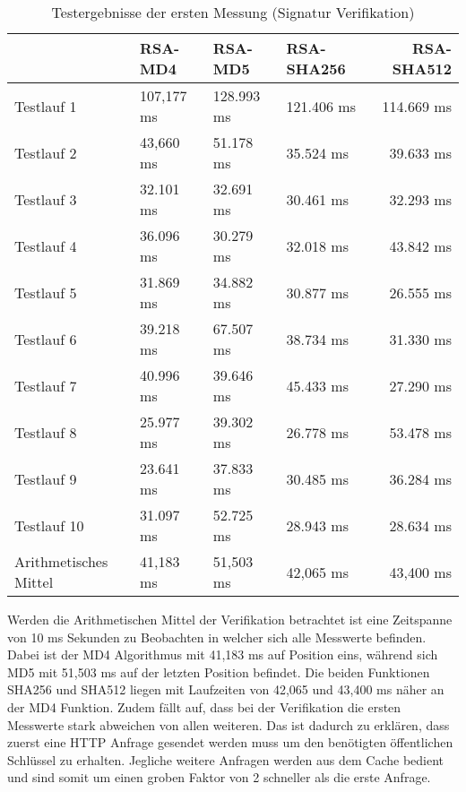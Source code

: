 \begin{table}[H]
	\begin{tabularx}{\textwidth}{p{}|X|X|X|r}
		& RSA-MD4 & RSA-MD5 & RSA-SHA256 & RSA-SHA512\\
		\hline
		Testlauf 1& 107,177 ms& 128.993 ms& 121.406 ms& 114.669 ms\\
		Testlauf 2& 43,660 ms& 51.178 ms& 35.524 ms& 39.633 ms\\
		Testlauf 3& 32.101 ms& 32.691 ms& 30.461 ms& 32.293 ms\\
		Testlauf 4& 36.096 ms& 30.279 ms& 32.018 ms& 43.842 ms\\
		Testlauf 5& 31.869 ms& 34.882 ms& 30.877 ms& 26.555 ms\\
		Testlauf 6& 39.218 ms& 67.507 ms& 38.734 ms& 31.330 ms\\
		Testlauf 7& 40.996 ms& 39.646 ms& 45.433 ms& 27.290 ms\\
		Testlauf 8& 25.977 ms& 39.302 ms& 26.778 ms& 53.478 ms\\
		Testlauf 9& 23.641 ms& 37.833 ms& 30.485 ms& 36.284 ms\\
		Testlauf 10& 31.097 ms& 52.725 ms& 28.943 ms& 28.634 ms\\
		\hline
		Arithmetisches Mittel& 41,183 ms& 51,503 ms& 42,065 ms& 43,400 ms
	\end{tabularx}
	\caption{Testergebnisse der ersten Messung (Signatur Verifikation)}
\end{table}
Werden die Arithmetischen Mittel der Verifikation betrachtet ist eine Zeitspanne von 10 ms Sekunden zu Beobachten in welcher sich alle Messwerte befinden. Dabei ist der MD4 Algorithmus mit 41,183 ms auf Position eins, während sich MD5 mit 51,503 ms auf der letzten Position befindet. Die beiden Funktionen SHA256 und SHA512 liegen mit Laufzeiten von 42,065 und 43,400 ms näher an der MD4 Funktion. Zudem fällt auf, dass bei der Verifikation die ersten Messwerte stark abweichen von allen weiteren. Das ist dadurch zu erklären, dass zuerst eine HTTP Anfrage gesendet werden muss um den benötigten öffentlichen Schlüssel zu erhalten. Jegliche weitere Anfragen werden aus dem Cache bedient und sind somit um einen groben Faktor von 2 schneller als die erste Anfrage.\\
